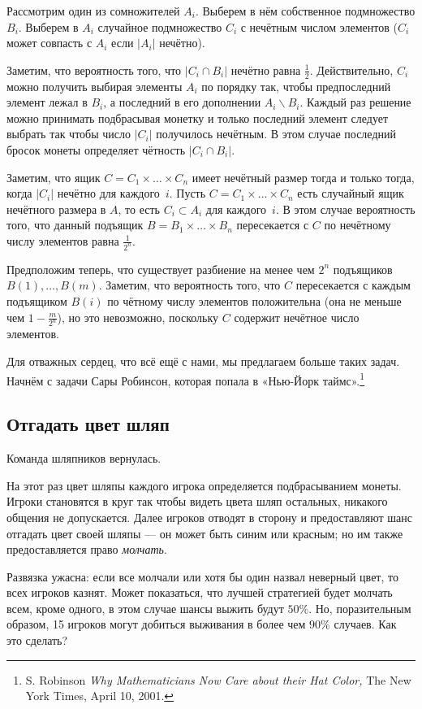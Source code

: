 Рассмотрим один из сомножителей $A_i$. 
Выберем в нём собственное подмножество $B_i$.
Выберем в $A_i$ случайное подмножество $C_i$ с нечётным числом элементов ($C_i$ может совпасть с $A_i$ если $|A_i|$ нечётно).

Заметим, что вероятность того, что $|C_i\cap B_i|$ нечётно равна $\tfrac12$.
Действительно, 
$C_i$ можно получить выбирая элементы $A_i$ по порядку так, чтобы предпоследний элемент лежал в $B_i$, а последний в его дополнении $A_i\backslash B_i$.
Каждый раз решение можно принимать подбрасывая монетку и только последний элемент следует выбрать так чтобы число $|C_i|$ получилось нечётным.
В этом случае последний бросок монеты определяет чётность $|C_i\cap B_i|$.

Заметим, что ящик $C=C_1{\times}\dots{\times}C_n$ имеет нечётный размер тогда и только тогда, когда $|C_i|$ нечётно для каждого~$i$.
Пусть $C=C_1{\times}\dots{\times}C_n$ есть случайный ящик нечётного размера в $A$, то есть $C_i\subset A_i$ для каждого~$i$.
В этом случае вероятность того, что данный подъящик $B=B_1{\times}\dots{\times}B_n$ пересекается с $C$ по нечётному числу элементов равна $\tfrac1{2^n}$. %

Предположим теперь, что существует разбиение на менее чем $2^n$ подъящиков $B(1),\dots,B(m)$.
Заметим, что вероятность того, что $C$ пересекается с каждым подъящиком $B(i)$ по чётному числу элементов положительна (она не меньше чем $1-\tfrac{m}{2^n}$),
но это невозможно, поскольку $C$ содержит нечётное число элементов.
\heart

Для отважных сердец, что всё ещё с нами, мы предлагаем больше таких задач.
Начнём с задачи Сары Робинсон, которая попала в «Нью-Йорк таймс».\footnote{S. Robinson \emph{Why Mathematicians Now Care about their Hat Color,} The New York Times, April 10, 2001.}

\subsection*{Отгадать цвет шляп}

Команда шляпников вернулась.

На этот раз цвет шляпы каждого игрока определяется подбрасыванием монеты.
Игроки становятся в круг так чтобы видеть цвета шляп остальных, никакого общения не допускается.
Далее игроков отводят в сторону и предоставляют шанс отгадать цвет своей шляпы --- он может быть синим или красным;
но им также предоставляется право \emph{молчать}.

Развязка ужасна: если все молчали или хотя бы один назвал неверный цвет, то всех игроков казнят.
Может показаться, что лучшей стратегией будет молчать всем, кроме одного, в этом случае шансы выжить будут $50\%$.
Но, поразительным образом, 15 игроков могут добиться выживания в более чем $90\%$ случаев. 
Как это сделать?

